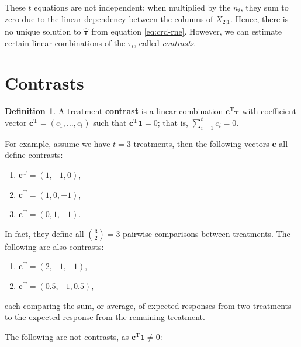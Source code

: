 \documentclass[
]{book}
\providecommand{\tightlist}{%
  \setlength{\itemsep}{0pt}\setlength{\parskip}{0pt}}
\theoremstyle{definition}
\newtheorem{definition}{Definition}[chapter]
\theoremstyle{definition}
\theoremstyle{definition}
\theoremstyle{definition}
\theoremstyle{remark}
\begin{document}
These \(t\) equations are not independent; when multiplied by the \(n_i\), they sum to zero due to the linear dependency between the columns of \(X_{2|1}\). Hence, there is no unique solution to \(\hat{\boldsymbol{\tau}}\) from equation \eqref{eq:crd-rne}. However, we can estimate certain linear combinations of the \(\tau_i\), called \emph{contrasts}.

\hypertarget{contrasts}{%
\section{Contrasts}\label{contrasts}}

\begin{definition}
\protect\hypertarget{def:contrast}{}\label{def:contrast}A treatment \textbf{contrast} is a linear combination \(\boldsymbol{c}^{\mathrm{T}}\boldsymbol{\tau}\) with coefficient vector \(\boldsymbol{c}^{\mathrm{T}} = (c_1,\ldots, c_t)\) such that \(\boldsymbol{c}^{\mathrm{T}}\boldsymbol{1} = 0\); that is, \(\sum_{i = 1}^t c_i = 0\).
\end{definition}

For example, assume we have \(t = 3\) treatments, then the following vectors \(\boldsymbol{c}\) all define contrasts:

\begin{enumerate}
\def\labelenumi{\arabic{enumi}.}
\tightlist
\item
  \(\boldsymbol{c}^{\mathrm{T}} = (1, -1, 0)\),
\item
  \(\boldsymbol{c}^{\mathrm{T}} = (1, 0, -1)\),
\item
  \(\boldsymbol{c}^{\mathrm{T}} = (0, 1, -1)\).
\end{enumerate}

In fact, they define all \({3\choose 2} = 3\) pairwise comparisons between treatments. The following are also contrasts:

\begin{enumerate}
\def\labelenumi{\arabic{enumi}.}
\setcounter{enumi}{3}
\tightlist
\item
  \(\boldsymbol{c}^{\mathrm{T}} = (2, -1, -1)\),
\item
  \(\boldsymbol{c}^{\mathrm{T}} = (0.5, -1, 0.5)\),
\end{enumerate}

each comparing the sum, or average, of expected responses from two treatments to the expected response from the remaining treatment.

The following are not contrasts, as \(\boldsymbol{c}^{\mathrm{T}}\boldsymbol{1} \ne 0\):
\end{document}
